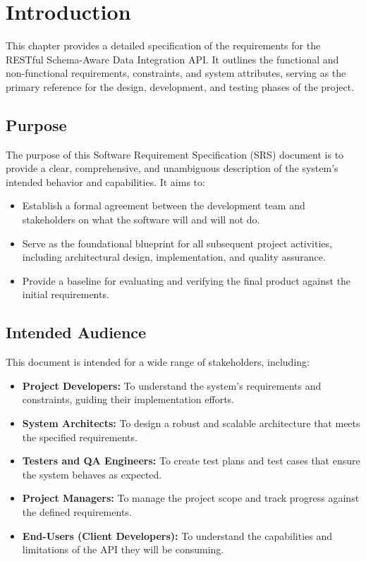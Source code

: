 \documentclass[12pt, a4paper]{report}
\begin{document}
\section{Introduction}
This chapter provides a detailed specification of the requirements for the RESTful Schema-Aware Data Integration API. It outlines the functional and non-functional requirements, constraints, and system attributes, serving as the primary reference for the design, development, and testing phases of the project.

\subsection{Purpose}
The purpose of this Software Requirement Specification (SRS) document is to provide a clear, comprehensive, and unambiguous description of the system's intended behavior and capabilities. It aims to:
\begin{itemize}
    \item Establish a formal agreement between the development team and stakeholders on what the software will and will not do.
    \item Serve as the foundational blueprint for all subsequent project activities, including architectural design, implementation, and quality assurance.
    \item Provide a baseline for evaluating and verifying the final product against the initial requirements.
\end{itemize}

\subsection{Intended Audience}
This document is intended for a wide range of stakeholders, including:
\begin{itemize}
    \item \textbf{Project Developers:} To understand the system's requirements and constraints, guiding their implementation efforts.
    \item \textbf{System Architects:} To design a robust and scalable architecture that meets the specified requirements.
    \item \textbf{Testers and QA Engineers:} To create test plans and test cases that ensure the system behaves as expected.
    \item \textbf{Project Managers:} To manage the project scope and track progress against the defined requirements.
    \item \textbf{End-Users (Client Developers):} To understand the capabilities and limitations of the API they will be consuming.
\end{itemize}
\end{document}
